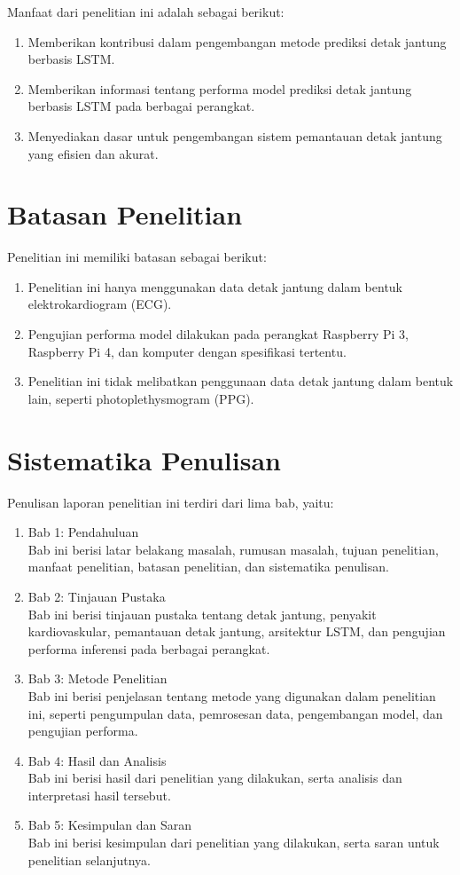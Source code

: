 Manfaat dari penelitian ini adalah sebagai berikut:

\begin{enumerate}
  \item Memberikan kontribusi dalam pengembangan metode prediksi detak jantung berbasis LSTM.
  \item Memberikan informasi tentang performa model prediksi detak jantung berbasis LSTM pada berbagai perangkat.
  \item Menyediakan dasar untuk pengembangan sistem pemantauan detak jantung yang efisien dan akurat.
\end{enumerate}

\section{Batasan Penelitian}

Penelitian ini memiliki batasan sebagai berikut:

\begin{enumerate}
  \item Penelitian ini hanya menggunakan data detak jantung dalam bentuk elektrokardiogram (ECG).
  \item Pengujian performa model dilakukan pada perangkat Raspberry Pi 3, Raspberry Pi 4, dan komputer dengan spesifikasi tertentu.
  \item Penelitian ini tidak melibatkan penggunaan data detak jantung dalam bentuk lain, seperti photoplethysmogram (PPG).
\end{enumerate}

\section{Sistematika Penulisan}

Penulisan laporan penelitian ini terdiri dari lima bab, yaitu:

\begin{enumerate}
  \item Bab 1: Pendahuluan \\
        Bab ini berisi latar belakang masalah, rumusan masalah, tujuan penelitian, manfaat penelitian, batasan penelitian, dan sistematika penulisan.
  \item Bab 2: Tinjauan Pustaka \\
        Bab ini berisi tinjauan pustaka tentang detak jantung, penyakit kardiovaskular, pemantauan detak jantung, arsitektur LSTM, dan pengujian performa inferensi pada berbagai perangkat.
  \item Bab 3: Metode Penelitian \\
        Bab ini berisi penjelasan tentang metode yang digunakan dalam penelitian ini, seperti pengumpulan data, pemrosesan data, pengembangan model, dan pengujian performa.
  \item Bab 4: Hasil dan Analisis \\
        Bab ini berisi hasil dari penelitian yang dilakukan, serta analisis dan interpretasi hasil tersebut.
  \item Bab 5: Kesimpulan dan Saran \\
        Bab ini berisi kesimpulan dari penelitian yang dilakukan, serta saran untuk penelitian selanjutnya.
\end{enumerate}
